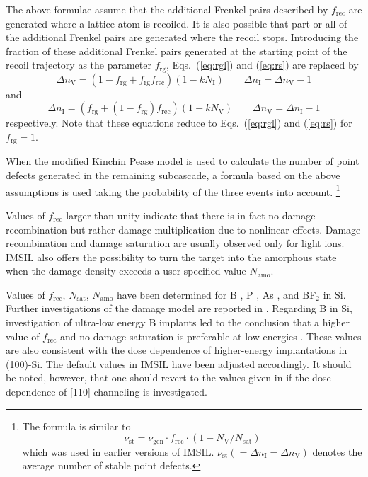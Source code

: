 The above formulae assume that the additional Frenkel pairs described by
$f_\mathrm{rec}$ are generated where a lattice atom is recoiled. It
is also possible that part or all of the additional Frenkel pairs are
generated where the recoil stops. Introducing the fraction of these
additional Frenkel pairs generated at the starting point of the recoil
trajectory as the parameter $f_\mathrm{rg}$, Eqs.~(\ref{eq:rgl}) and 
(\ref{eq:rs}) are replaced by
%
\begin{equation}
   \Delta n_\mathrm{V} = (1 - f_\mathrm{rg} + f_\mathrm{rg} f_\mathrm{rec}) 
   (1-kN_\mathrm{I}) \qquad 
   \Delta n_\mathrm{I} = \Delta n_\mathrm{V} - 1
   \label{eq:rgl2}
\end{equation}
%
and
%
\begin{equation}
   \Delta n_\mathrm{I} = (f_\mathrm{rg} + (1-f_\mathrm{rg}) f_\mathrm{rec})
   (1-kN_\mathrm{V}) \qquad 
   \Delta n_\mathrm{V} = \Delta n_\mathrm{I} - 1
   \label{eq:rs2}   
\end{equation}
%
respectively. Note that these equations reduce to Eqs.~(\ref{eq:rgl}) and 
(\ref{eq:rs}) for $f_\mathrm{rg}=1$.


When the modified Kinchin Pease model is used to calculate the number of point
defects generated in the remaining subcascade, a formula based on the above
assumptions is used taking the probability of the three events into account.%
\footnote{The formula is similar to  
%
\begin{displaymath}
   \nu_\mathrm{st} = \nu_\mathrm{gen} \cdot f_\mathrm{rec} \cdot
      (1 - N_\mathrm{V} / N_\mathrm{sat} )
\end{displaymath}
%
which was used in earlier versions of IMSIL. $\nu_\mathrm{st} (= 
\Delta n_\mathrm{I} = \Delta n_\mathrm{V})$ denotes the average number of 
stable point defects.}

Values of $f_\mathrm{rec}$ larger than unity indicate that there is in
fact no damage recombination but rather damage multiplication due to
nonlinear effects. Damage recombination and damage saturation are
usually observed only for light ions. IMSIL also offers the possibility to turn
the target into the amorphous state when the damage density exceeds a user
specified value $N_\mathrm{amo}$.

Values of $f_\mathrm{rec}$, $N_\mathrm{sat}$, $N_\mathrm{amo}$ have been
determined for B \cite{hobler_boron_1995}, P \cite{hobler_net_1996,
herzog_monte_1995}, As \cite{hobler_net_1996, simionescu_modeling_1995}, and
BF$_2$ \cite{hobler_net_1996, simionescu_monte_1995} in Si. Further
investigations of the damage model are reported in
\cite{hobler_verification_1996, simionescu_comparison_1995}. Regarding B in Si, 
investigation of ultra-low energy B implants led to the conclusion that a
higher value of $f_\mathrm{rec}$ and no damage saturation is preferable at low energies
\cite{hobler_modeling_1997}. These values are also  consistent with the dose
dependence of higher-energy implantations in (100)-Si. The default values in
IMSIL have been adjusted accordingly. It should be noted, however, that one
should revert to the values given in \cite{I9504} if the dose dependence of
[110] channeling is investigated. 

